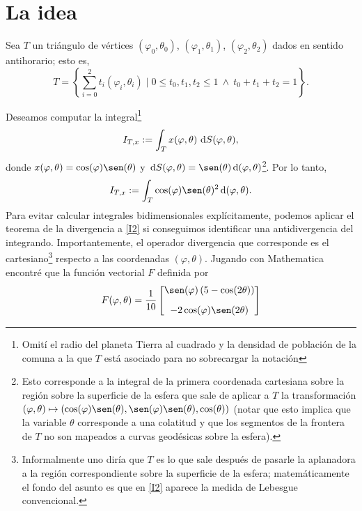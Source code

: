 \documentclass[reqno]{amsart}
\newcommand{\dd}[1][y]{\if#1y\,\fi{\mathrm d}} %
\begin{document}
\section{La idea}

Sea $T$ un triángulo de vértices $(\varphi_0, \theta_0)$, $(\varphi_1, \theta_1)$, $(\varphi_2, \theta_2)$ dados en sentido antihorario; esto es,
%
\begin{equation}\label{T}
T = \left\{ \sum_{i=0}^2 t_i (\varphi_i, \theta_i) \mid 0 \leq t_0, t_1, t_2 \leq 1 \ \wedge \ t_0+t_1+t_2=1 \right\}.
\end{equation}
%

Deseamos computar la integral\footnote{Omití el radio del planeta Tierra al cuadrado y la densidad de población de la comuna a la que $T$ está asociado para no sobrecargar la notación}
%
\begin{equation}\label{I1}
I_{T,x} := \int_T x(\varphi, \theta) \, \dd S(\varphi, \theta),
\end{equation}
%
donde $x(\varphi,\theta) = \cos(\varphi) \sen(\theta)$ y $\dd S(\varphi, \theta) = \sen(\theta) \dd(\varphi,\theta)$\footnote{Esto corresponde a la integral de la primera coordenada cartesiana sobre la región sobre la superficie de la esfera que sale de aplicar a $T$ la transformación $(\varphi, \theta) \mapsto (\cos(\varphi) \sen(\theta), \sen(\varphi) \sen(\theta), \cos(\theta))$ (notar que esto implica que la variable $\theta$ corresponde a una colatitud y que los segmentos de la frontera de $T$ no son mapeados a curvas geodésicas sobre la esfera).}.
Por lo tanto,
%
\begin{equation}\label{I2}
I_{T,x} := \int_T \cos(\varphi) \sen(\theta)^2 \dd(\varphi, \theta).
\end{equation}
%
Para evitar calcular integrales bidimensionales explícitamente, podemos aplicar el teorema de la divergencia a \eqref{I2} si conseguimos identificar una antidivergencia del integrando.
Importantemente, el operador divergencia que corresponde es el cartesiano\footnote{Informalmente uno diría que $T$ es lo que sale después de pasarle la aplanadora a la región correspondiente sobre la superficie de la esfera; matemáticamente el fondo del asunto es que en \eqref{I2} aparece la medida de Lebesgue convencional.} respecto a las coordenadas $(\varphi, \theta)$.
Jugando con Mathematica encontré que la función vectorial $F$ definida por
%
\begin{equation}\label{F}
F(\varphi, \theta) = \frac{1}{10}\begin{bmatrix}
\sen(\varphi) \left( 5 - \cos(2\theta) \right)\\[2ex]
-2 \cos(\varphi) \sen(2\theta)
\end{bmatrix}
\end{equation}
\end{document}
